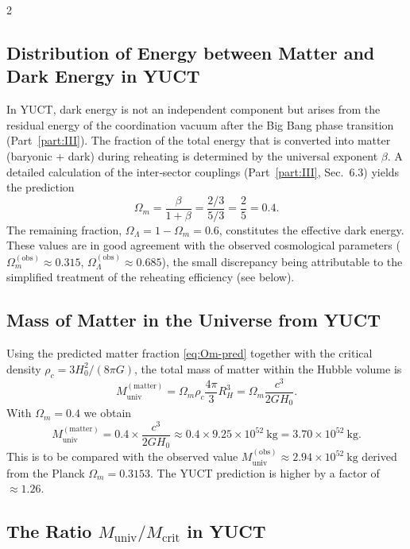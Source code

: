 \documentclass[12pt,a4paper]{article}
\begin{document}
\begin{multicols}{2}
		\subsection{Distribution of Energy between Matter and Dark Energy in YUCT}
		
		In YUCT, dark energy is not an independent component but arises from the residual energy of the coordination vacuum after the Big Bang phase transition (Part~\ref{part:III}). The fraction of the total energy that is converted into matter (baryonic + dark) during reheating is determined by the universal exponent \(\beta\). A detailed calculation of the inter‑sector couplings (Part~\ref{part:III}, Sec.~6.3) yields the prediction
		\begin{equation}
			\Omega_m = \frac{\beta}{1+\beta} = \frac{2/3}{5/3} = \frac{2}{5} = 0.4.
			\label{eq:Om-pred}
		\end{equation}
		The remaining fraction, \(\Omega_\Lambda = 1 - \Omega_m = 0.6\), constitutes the effective dark energy. These values are in good agreement with the observed cosmological parameters (\(\Omega_m^{\mathrm{(obs)}} \approx 0.315\), \(\Omega_\Lambda^{\mathrm{(obs)}} \approx 0.685\)), the small discrepancy being attributable to the simplified treatment of the reheating efficiency (see below).
		
		\subsection{Mass of Matter in the Universe from YUCT}
		
		Using the predicted matter fraction \eqref{eq:Om-pred} together with the critical density \(\rho_c = 3H_0^2/(8\pi G)\), the total mass of matter within the Hubble volume is
		\begin{equation}
			M_{\mathrm{univ}}^{\mathrm{(matter)}} = \Omega_m \rho_c \frac{4\pi}{3} R_H^3 = \Omega_m \frac{c^3}{2 G H_0}.
			\label{eq:muniv-matter}
		\end{equation}
		With \(\Omega_m = 0.4\) we obtain
		\[
		M_{\mathrm{univ}}^{\mathrm{(matter)}} = 0.4 \times \frac{c^3}{2 G H_0} \approx 0.4 \times 9.25\times 10^{52}\ \mathrm{kg} = 3.70\times 10^{52}\ \mathrm{kg}.
		\]
		This is to be compared with the observed value \(M_{\mathrm{univ}}^{\mathrm{(obs)}} \approx 2.94\times 10^{52}\ \mathrm{kg}\) derived from the Planck \(\Omega_m = 0.3153\). The YUCT prediction is higher by a factor of \(\approx 1.26\).
		
		\subsection{The Ratio \(M_{\mathrm{univ}} / M_{\mathrm{crit}}\) in YUCT}
		

\end{multicols}
\end{document}
